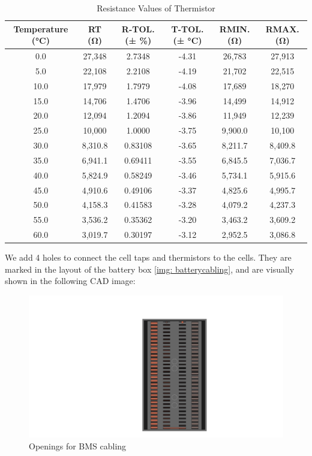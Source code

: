 \begin{table}[ht]
    \centering
    \caption{Resistance Values of Thermistor}
    \label{resistance-values-thermistor1}
    \begin{tabular}{|c|c|c|c|c|c|}
        \toprule
        Temperature (°C) & RT (Ω) & R-TOL. (± \%) & T-TOL. (± °C) & RMIN. (Ω) & RMAX. (Ω) \\
        \midrule
        0.0 & 27,348 & 2.7348 & -4.31 & 26,783 & 27,913 \\
        5.0 & 22,108 & 2.2108 & -4.19 & 21,702 & 22,515 \\
        10.0 & 17,979 & 1.7979 & -4.08 & 17,689 & 18,270 \\
        15.0 & 14,706 & 1.4706 & -3.96 & 14,499 & 14,912 \\
        20.0 & 12,094 & 1.2094 & -3.86 & 11,949 & 12,239 \\
        25.0 & 10,000 & 1.0000 & -3.75 & 9,900.0 & 10,100 \\
        30.0 & 8,310.8 & 0.83108 & -3.65 & 8,211.7 & 8,409.8 \\
        35.0 & 6,941.1 & 0.69411 & -3.55 & 6,845.5 & 7,036.7 \\
        40.0 & 5,824.9 & 0.58249 & -3.46 & 5,734.1 & 5,915.6 \\
        45.0 & 4,910.6 & 0.49106 & -3.37 & 4,825.6 & 4,995.7 \\
        50.0 & 4,158.3 & 0.41583 & -3.28 & 4,079.2 & 4,237.3 \\
        55.0 & 3,536.2 & 0.35362 & -3.20 & 3,463.2 & 3,609.2 \\
        60.0 & 3,019.7 & 0.30197 & -3.12 & 2,952.5 & 3,086.8 \\
        \bottomrule
    \end{tabular}
\end{table}

We add 4 holes to connect the cell taps and thermistors to the cells. They are marked in the layout of the battery box \ref{img: batterycabling}, and are visually shown in the following CAD image:
\begin{figure}[ht]
    \centering
    \includegraphics[width=\textwidth, angle=90]{texfiles/elec/eimg/BatteryPackHoles}
    \caption{Openings for BMS cabling}
\end{figure}
\newline

